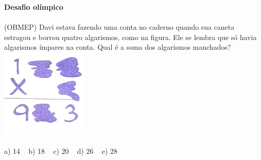 \documentclass[a4paper,14pt]{article}
\begin{document}
\begin{multicols}{2}
\begin{enumerate}
    		\textbf{Desafio olímpico} \\\\
    		(OBMEP) Davi estava fazendo uma conta no caderno quando sua caneta estragou e borrou quatro algarismos, como na figura. Ele se lembra que só havia algarismos ímpares na conta. Qual é a soma dos algarismos manchados? \\
    		\includegraphics[width=0.6\linewidth]{6FMA46_imagens/imagem7} 
    		\\\\
    		a) 14 ~ b) 18 ~ c) 20 ~ d) 26 ~ e) 28
    	\end{enumerate}
    	$~$ \\ $~$ \\ $~$ \\ $~$ \\ $~$ \\ $~$ \\ $~$ \\ $~$ \\ $~$ \\ $~$ \\ $~$ \\ $~$ \\ $~$ \\ $~$ \\ $~$ \\ $~$ \\ $~$ \\ $~$ \\ $~$ \\ $~$ \\
	\end{multicols}
\end{document}
